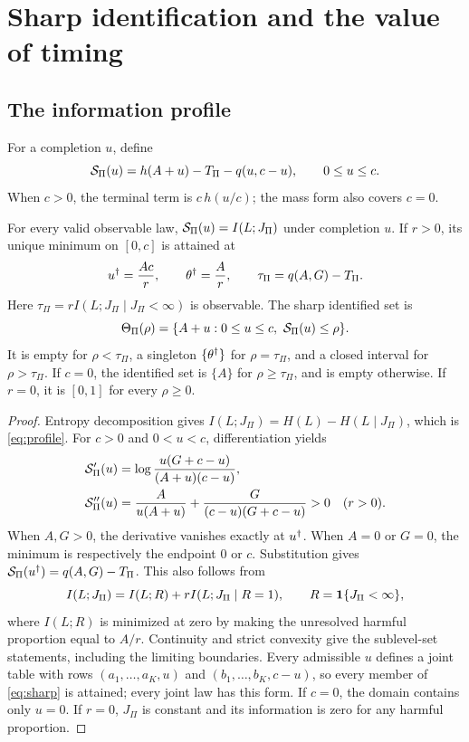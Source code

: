 \section{Sharp identification and the value of timing}\label{sec:identification}
\subsection{The information profile}
For a completion $u$, define
\begin{equation}\label{eq:profile}
 \mathcal S_\Pi(u)=h(A+u)-T_\Pi-q(u,c-u),\qquad 0\le u\le c.
\end{equation}
When $c>0$, the terminal term is $c\,h(u/c)$; the mass form also covers $c=0$.

\begin{theorem}\label{thm:sharp}
For every valid observable law, $\mathcal S_\Pi(u)=I(L;J_\Pi)$ under completion $u$. If $r>0$, its unique minimum on $[0,c]$ is attained at
\begin{equation}\label{eq:minimum}
 u^\dagger=\frac{Ac}{r},\qquad \theta^\dagger=\frac{A}{r},\qquad
 \tau_\Pi=q(A,G)-T_\Pi.
\end{equation}
Here $\tau_\Pi=r I(L;J_\Pi\mid J_\Pi<\infty)$ is observable. The sharp identified set is
\begin{equation}\label{eq:sharp}
 \Theta_\Pi(\rho)=\{A+u:0\le u\le c,\ \mathcal S_\Pi(u)\le\rho\}.
\end{equation}
It is empty for $\rho<\tau_\Pi$, a singleton $\{\theta^\dagger\}$ for $\rho=\tau_\Pi$, and a closed interval for $\rho>\tau_\Pi$. If $c=0$, the identified set is $\{A\}$ for $\rho\ge\tau_\Pi$, and is empty otherwise. If $r=0$, it is $[0,1]$ for every $\rho\ge0$.
\end{theorem}
\begin{proof}
Entropy decomposition gives $I(L;J_\Pi)=H(L)-H(L\mid J_\Pi)$, which is \eqref{eq:profile}. For $c>0$ and $0<u<c$, differentiation yields
\begin{align}
 \mathcal S_\Pi'(u)&=\log\frac{u(G+c-u)}{(A+u)(c-u)},\label{eq:derivative}\\
 \mathcal S_\Pi''(u)&=\frac{A}{u(A+u)}+
       \frac{G}{(c-u)(G+c-u)}>0\quad(r>0).\label{eq:curvature}
\end{align}
When $A,G>0$, the derivative vanishes exactly at $u^\dagger$. When $A=0$ or $G=0$, the minimum is respectively the endpoint $0$ or $c$. Substitution gives $\mathcal S_\Pi(u^\dagger)=q(A,G)-T_\Pi$. This also follows from
\begin{equation}\label{eq:decomposition}
 I(L;J_\Pi)=I(L;R)+rI(L;J_\Pi\mid R=1),\qquad R=\mathbf 1\{J_\Pi<\infty\},
\end{equation}
where $I(L;R)$ is minimized at zero by making the unresolved harmful proportion equal to $A/r$. Continuity and strict convexity give the sublevel-set statements, including the limiting boundaries. Every admissible $u$ defines a joint table with rows $(a_1,\ldots,a_K,u)$ and $(b_1,\ldots,b_K,c-u)$, so every member of \eqref{eq:sharp} is attained; every joint law has this form. If $c=0$, the domain contains only $u=0$. If $r=0$, $J_\Pi$ is constant and its information is zero for any harmful proportion.
\end{proof}

